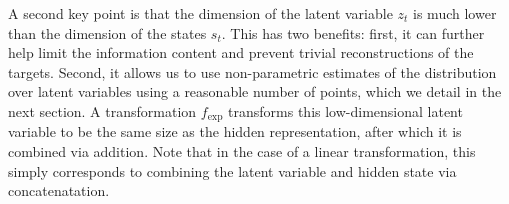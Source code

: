 \documentclass{article}
\begin{document}
A second key point is that the dimension of the latent variable $z_t$ is much lower than the dimension of the states $s_t$. This has two benefits: first, it can further help limit the information content and prevent trivial reconstructions of the targets. Second, it allows us to use non-parametric estimates of the distribution over latent variables using a reasonable number of points, which we detail in the next section. A transformation $f_\text{exp}$ transforms this low-dimensional latent variable to be the same size as the hidden representation, after which it is combined via addition. Note that in the case of a linear transformation, this simply corresponds to combining the latent variable and hidden state via concatenatation.

\end{document}
